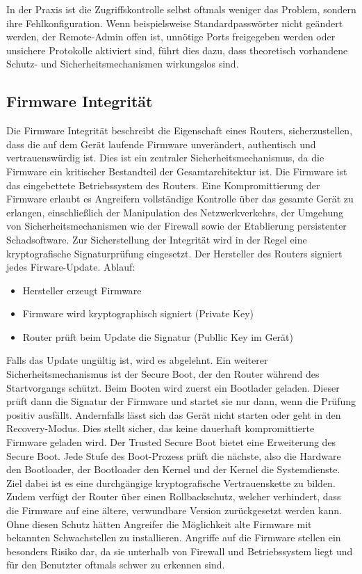 	In der Praxis ist die Zugriffskontrolle selbst oftmals weniger das Problem, sondern ihre Fehlkonfiguration.
	Wenn beispielsweise Standardpasswörter nicht geändert werden, der Remote-Admin offen ist, unnötige Ports
	freigegeben werden oder unsichere Protokolle aktiviert sind, führt dies dazu, dass theoretisch vorhandene
	Schutz- und Sicherheitsmechanismen wirkungslos sind. \cite{tracy2007b}
	
	\subsection{Firmware Integrität}
	\label{sec:Firmware Integrität}
	Die Firmware Integrität beschreibt die Eigenschaft eines Routers, sicherzustellen, dass die auf dem
	Gerät laufende Firmware unverändert, authentisch und vertrauenswürdig ist. Dies ist ein zentraler
	Sicherheitsmechanismus, da die Firmware ein kritischer Bestandteil der Gesamtarchitektur ist.
	Die Firmware ist das eingebettete Betriebssystem des Routers. 
	Eine Kompromittierung der Firmware erlaubt es Angreifern vollständige Kontrolle über das
	gesamte Gerät zu erlangen, einschließlich der Manipulation des Netzwerkverkehrs, der Umgehung
 	von Sicherheitsmechanismen wie der Firewall sowie der Etablierung persistenter Schadsoftware.
	Zur Sicherstellung der Integrität wird in der Regel eine kryptografische Signaturprüfung eingesetzt.
	Der Hersteller des Routers signiert jedes Firware-Update.
	Ablauf:
	\begin{itemize}
		\item{Hersteller erzeugt Firmware}
		\item{Firmware wird kryptographisch signiert (Private Key)}
		\item{Router prüft beim Update die Signatur (Publlic Key im Gerät)}
	\end{itemize}
	Falls das Update ungültig ist, wird es abgelehnt.
	Ein weiterer Sicherheitsmechanismus ist der Secure Boot, der den Router während des Startvorgangs schützt.
	Beim Booten wird zuerst ein Bootlader geladen. Dieser prüft dann die Signatur der Firmware und startet sie nur dann,
	wenn die Prüfung positiv ausfällt. Andernfalls lässt sich das Gerät nicht starten oder geht in den
	Recovery-Modus. Dies stellt sicher, das keine dauerhaft kompromittierte Firmware geladen wird.
	Der Trusted Secure Boot bietet eine Erweiterung des Secure Boot. Jede Stufe des Boot-Prozess prüft die nächste,
	also die Hardware den Bootloader, der Bootloader den Kernel und der Kernel die Systemdienste.
	Ziel dabei ist es eine durchgängige kryptografische Vertrauenskette zu bilden.
	Zudem verfügt der Router über einen Rollbackschutz, welcher verhindert, dass die Firmware auf eine ältere,
	verwundbare Version zurückgesetzt werden kann. Ohne diesen Schutz hätten Angreifer die Möglichkeit alte Firmware
	mit bekannten Schwachstellen zu installieren.
	Angriffe auf die Firmware stellen ein besonders Risiko dar, da sie unterhalb von Firewall und Betriebssystem liegt 
	und für den Benutzter oftmals schwer zu erkennen sind. \cite{regenscheid2018bb}

